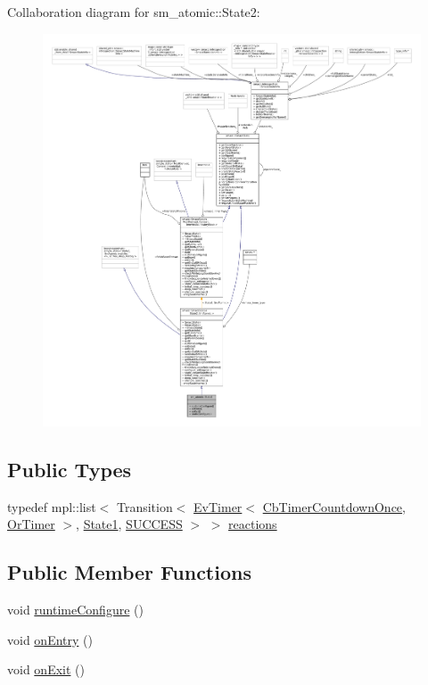 Collaboration diagram for sm\+\_\+atomic\+:\+:State2\+:
\nopagebreak
\begin{figure}[H]
\begin{center}
\leavevmode
\includegraphics[width=350pt]{structsm__atomic_1_1State2__coll__graph}
\end{center}
\end{figure}
\subsection*{Public Types}
\begin{DoxyCompactItemize}
\item 
typedef mpl\+::list$<$ Transition$<$ \hyperlink{structcl__ros__timer_1_1EvTimer}{Ev\+Timer}$<$ \hyperlink{classcl__ros__timer_1_1CbTimerCountdownOnce}{Cb\+Timer\+Countdown\+Once}, \hyperlink{classsm__atomic_1_1OrTimer}{Or\+Timer} $>$, \hyperlink{structsm__atomic_1_1State1}{State1}, \hyperlink{structsmacc_1_1default__transition__tags_1_1SUCCESS}{S\+U\+C\+C\+E\+SS} $>$ $>$ \hyperlink{structsm__atomic_1_1State2_a9436556de6be8ea64fd35707aa4bfec8}{reactions}
\end{DoxyCompactItemize}
\subsection*{Public Member Functions}
\begin{DoxyCompactItemize}
\item 
void \hyperlink{structsm__atomic_1_1State2_afd749890e13d8aa36f1ac6645a5f7f9a}{runtime\+Configure} ()
\item 
void \hyperlink{structsm__atomic_1_1State2_a85ae934666acb451cd847c7192be72fc}{on\+Entry} ()
\item 
void \hyperlink{structsm__atomic_1_1State2_ac6aed12a8e4fa53968de90ca540a59ff}{on\+Exit} ()
\end{DoxyCompactItemize}
